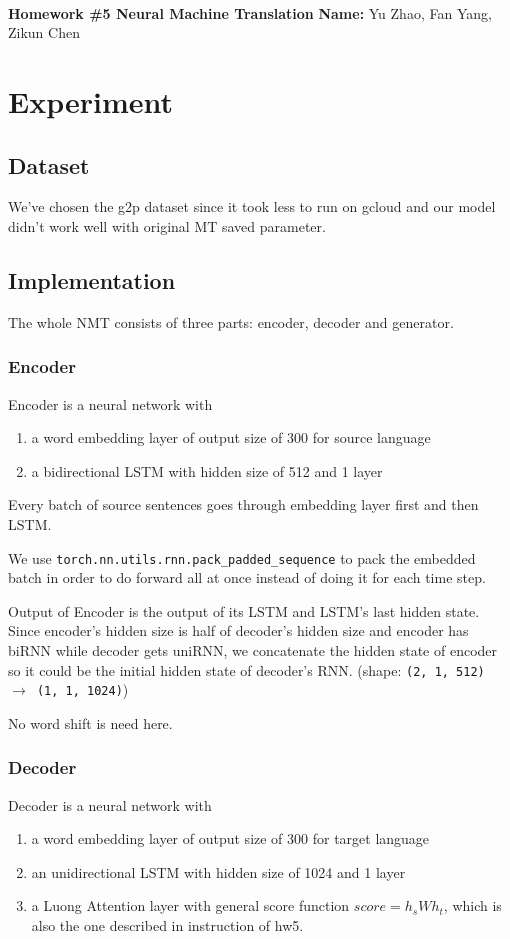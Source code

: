 \documentclass[11pt]{article}
\begin{document}
\\
{{\bf Homework \#5 Neural Machine Translation}} \hfill {{\bf Name:} Yu Zhao, Fan Yang, Zikun Chen} \\

\section{Experiment}
\subsection{Dataset}
We've chosen the g2p dataset since it took less to run on gcloud and our model didn't work well with original MT saved parameter.
\subsection{Implementation}
The whole NMT consists of three parts: encoder, decoder and generator.
\subsubsection{Encoder}
Encoder is a neural network with 
\begin{enumerate}
\item a word embedding layer of output size of 300 for source language
\item a bidirectional LSTM with hidden size of 512 and 1 layer
\end{enumerate}
Every batch of source sentences goes through embedding layer first and then LSTM.

We use \texttt{torch.nn.utils.rnn.pack\_padded\_sequence} to pack the embedded batch in order to do forward all at once instead of doing it for each time step.

Output of Encoder is the output of its LSTM and LSTM's last hidden state. Since encoder's hidden size is half of decoder's hidden size and encoder has biRNN while decoder gets uniRNN, we concatenate the hidden state of encoder so it could be the initial hidden state of decoder's RNN. (shape: \texttt{(2, 1, 512) $\rightarrow$ (1, 1, 1024)})

No word shift is need here.
\subsubsection{Decoder}
Decoder is a neural network with
\begin{enumerate}
\item a word embedding layer of output size of 300 for target language
\item an unidirectional LSTM with hidden size of 1024 and 1 layer
\item a Luong Attention layer with general score function $score = h_sWh_t$, which is also the one described in instruction of hw5.
\end{enumerate}
\end{document}
